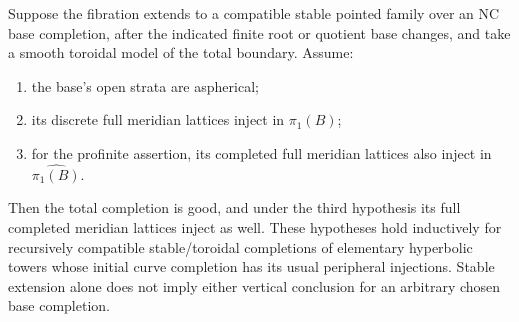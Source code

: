 \begin{theorem}\label{P3b-vertical}
Suppose the fibration extends to a compatible stable pointed
family over an NC base completion, after the indicated finite
root or quotient base changes, and take a smooth toroidal model
of the total boundary. Assume:
\begin{enumerate}
\item the base's open strata are aspherical;
\item its discrete full meridian lattices inject in $\pi _1(B)$;
\item for the profinite assertion, its completed full meridian
lattices also inject in $\widehat{\pi _1(B)}$.
\end{enumerate}
Then the total completion is good, and under the third hypothesis
its full completed meridian lattices inject as well. These
hypotheses hold inductively for recursively compatible
stable/toroidal completions of elementary hyperbolic towers
whose initial curve completion has its usual peripheral
injections. Stable extension alone does not imply either
vertical conclusion for an arbitrary chosen base completion.
\end{theorem}
